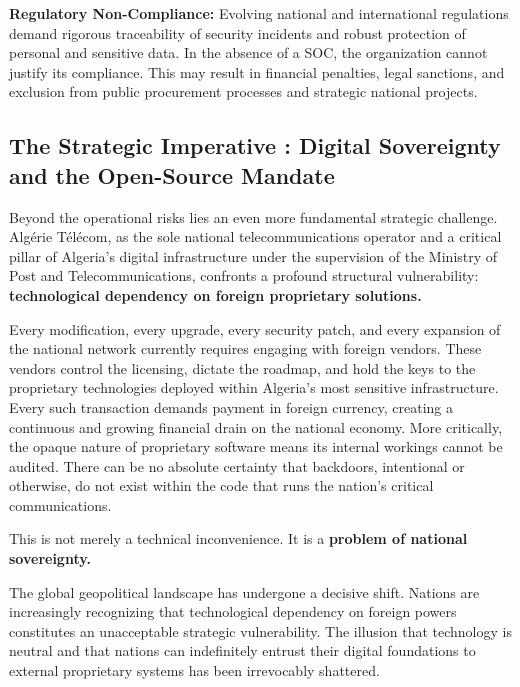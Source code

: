 \textbf{Regulatory Non-Compliance:} Evolving national and international regulations demand rigorous traceability of security incidents and robust protection of personal and sensitive data. In the absence of a SOC, the organization cannot justify its compliance. This may result in financial penalties, legal sanctions, and exclusion from public procurement processes and strategic national projects.

\subsection{The Strategic Imperative : Digital Sovereignty and the Open-Source Mandate}
\label{subsec:souverainete}

Beyond the operational risks lies an even more fundamental strategic challenge. Algérie Télécom, as the sole national telecommunications operator and a critical pillar of Algeria's digital infrastructure under the supervision of the Ministry of Post and Telecommunications, confronts a profound structural vulnerability: \textbf{technological dependency on foreign proprietary solutions.}

Every modification, every upgrade, every security patch, and every expansion of the national network currently requires engaging with foreign vendors. These vendors control the licensing, dictate the roadmap, and hold the keys to the proprietary technologies deployed within Algeria's most sensitive infrastructure. Every such transaction demands payment in foreign currency, creating a continuous and growing financial drain on the national economy. More critically, the opaque nature of proprietary software means its internal workings cannot be audited. There can be no absolute certainty that backdoors, intentional or otherwise, do not exist within the code that runs the nation's critical communications.

This is not merely a technical inconvenience. It is a \textbf{problem of national sovereignty.}

The global geopolitical landscape has undergone a decisive shift. Nations are increasingly recognizing that technological dependency on foreign powers constitutes an unacceptable strategic vulnerability. The illusion that technology is neutral and that nations can indefinitely entrust their digital foundations to external proprietary systems has been irrevocably shattered.

